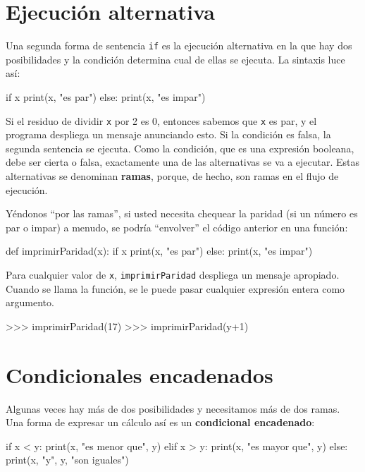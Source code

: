 \section{Ejecución alternativa}

\label{alternative execution2}

Una segunda forma de sentencia \texttt{if} es la ejecución alternativa
en la que hay dos posibilidades y la condición determina cual de ellas
se ejecuta. La sintaxis luce así:
\begin{pythoncode}
if x%
  print(x, "es par")
else:
  print(x, "es impar")
\end{pythoncode}

Si el residuo de dividir \texttt{x} por 2 es 0, entonces sabemos que
\texttt{x} es par, y el programa despliega un mensaje anunciando esto.
Si la condición es falsa, la segunda sentencia se ejecuta. Como la
condición, que es una expresión booleana, debe ser cierta o falsa,
exactamente una de las alternativas se va a ejecutar. Estas alternativas
se denominan \textbf{ramas}, porque, de hecho, son ramas en el flujo
de ejecución.


Yéndonos ``por las ramas'', si usted necesita chequear la paridad
(si un número es par o impar) a menudo, se podría ``envolver'' el
código anterior en una función:
\begin{pythoncode}
def imprimirParidad(x):
  if x%
    print(x, "es par")
  else:
    print(x, "es impar")
\end{pythoncode}

Para cualquier valor de \texttt{x}, \texttt{imprimirParidad} despliega
un mensaje apropiado. Cuando se llama la función, se le puede pasar
cualquier expresión entera como argumento.
\begin{pyconcode}
>>> imprimirParidad(17)
>>> imprimirParidad(y+1)
\end{pyconcode}

\section{Condicionales encadenados}

 

Algunas veces hay más de dos posibilidades y necesitamos más de dos
ramas. Una forma de expresar un cálculo así es un \textbf{condicional
encadenado}:

\begin{pythoncode}
if x < y:
  print(x, "es menor que", y)
elif x > y:
  print(x, "es mayor que", y)
else:
  print(x, "y", y, "son iguales")
\end{pythoncode}


